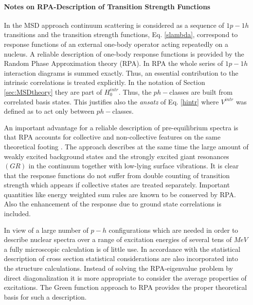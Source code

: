 \documentclass[twocolumn,amsmath,amssymb,10pt,groupedaddress,letter]{revtex4}
\begin{document}
\medskip
\paragraph{Notes on RPA-Description of Transition Strength Functions}
In the MSD approach continuum scattering is considered
as a sequence of $1p-1h$ transitions and the transition strength
functions, Eq. \ref{slambda}, correspond to response functions of
an external one-body operator acting repeatedly on a nucleus. A reliable
description of one-body response functions is provided by the Random
Phase Approximation theory \cite{Neg,Wal} (RPA). In RPA
the whole series of $1p-1h$ interaction diagrams is summed exactly.
Thus, an essential contribution to the intrinsic correlations is treated
explicitly. In the notation of Section \ref{sec:MSDtheory} they are part
of $H_{0}^{intr}$. Thus, the $ph-$classes are built from correlated
basis states. This justifies also the \textit{ansatz} of Eq. \ref{hintr}
where $V^{intr}$ was defined as to act only between $ph-$classes.

An important advantage for a reliable description of pre-equilibrium
spectra is that RPA accounts for collective and non-collective
features on the same theoretical footing \cite{Wal,BM,LW92,SLW,RegT}.
The approach describes at the same time the large amount of weakly
excited background states and the strongly excited giant resonances
$(GR)$ in the continuum together with low-lying surface vibrations.
It is clear that the response functions do not suffer from double
counting of transition strength which appears if collective states
are treated separately. Important quantities like energy weighted
sum rules are known to be conserved by RPA. Also the enhancement
of the response due to ground state correlations is included.

In view of a large number of $p-h$ configurations which are needed
in order to describe nuclear spectra over a range of excitation energies
of several tens of $MeV$ a fully microscopic calculation is of little
use. In accordance with the statistical description of cross section
statistical considerations are also incorporated into the structure
calculations. Instead of solving the RPA-eigenvalue problem
by direct diagonalization it is more appropriate to consider the average
properties of excitations. The Green function approach to RPA
\cite{Wal,LW92} provides the proper theoretical basis for such a
description.
\end{document}
